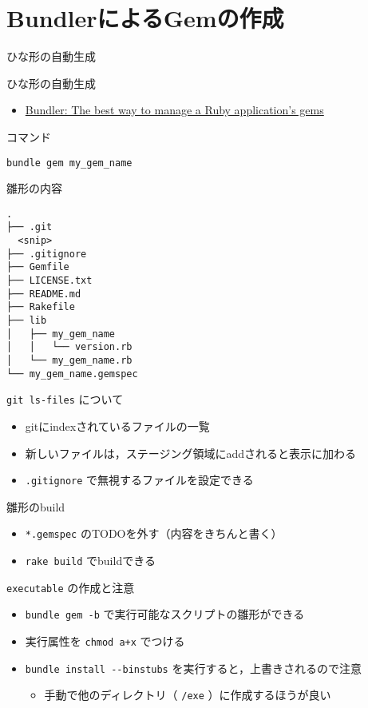 \documentclass[t, aspectratio=169]{beamer}
\begin{document}
\section{BundlerによるGemの作成}
\label{sec-4-3}
\begin{frame}[fragile,label=sec-4-3-1]{ひな形の自動生成}
 \begin{block}{ひな形の自動生成}
\begin{itemize}
\item \href{http://bundler.io/v1.7/bundle_gem.html}{Bundler: The best way to manage a Ruby application's gems}
\end{itemize}
\end{block}

\begin{block}{コマンド}
\begin{verbatim}
bundle gem my_gem_name
\end{verbatim}
\end{block}
\end{frame}
\begin{frame}[fragile,label=sec-4-3-2]{雛形の内容}
 \begin{verbatim}
.
├── .git
  <snip>
├── .gitignore
├── Gemfile
├── LICENSE.txt
├── README.md
├── Rakefile
├── lib
│   ├── my_gem_name
│   │   └── version.rb
│   └── my_gem_name.rb
└── my_gem_name.gemspec
\end{verbatim}
\end{frame}
\begin{frame}[fragile,label=sec-4-3-3]{\texttt{git ls-files} について}
 \begin{itemize}
\item gitにindexされているファイルの一覧
\item 新しいファイルは，ステージング領域にaddされると表示に加わる
\item \texttt{.gitignore} で無視するファイルを設定できる
\end{itemize}
\end{frame}
\begin{frame}[fragile,label=sec-4-3-4]{雛形のbuild}
 \begin{itemize}
\item \texttt{*.gemspec} のTODOを外す（内容をきちんと書く）
\item \texttt{rake build} でbuildできる
\end{itemize}
\end{frame}
\begin{frame}[fragile,label=sec-4-3-5]{\texttt{executable} の作成と注意}
 \begin{itemize}
\item \texttt{bundle gem -b} で実行可能なスクリプトの雛形ができる
\item 実行属性を \texttt{chmod a+x} でつける
\item \texttt{bundle install -{}-binstubs} を実行すると，上書きされるので注意
\begin{itemize}
\item 手動で他のディレクトリ（ \texttt{/exe} ）に作成するほうが良い
\end{itemize}
\end{itemize}
\end{frame}
\end{document}
